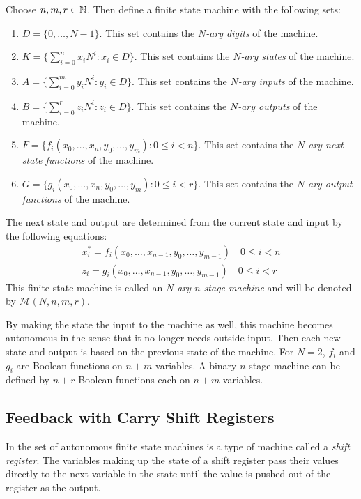 \begin{definition}\label{N-ary-n-stage-machine}
  Choose $n,m,r\in\mathbb{N}$. Then define a finite state machine with the
  following sets:
  \begin{enumerate}[1.]
    \item $D=\{0,\dots,N-1\}$. This set contains the {\em $N$-ary digits} of the
      machine.
    \item $K=\{\sum_{i=0}^{n}x_iN^i:x_i\in D\}$. This set contains the
      {\em $N$-ary states} of the machine.
    \item $A=\{\sum_{i=0}^{m}y_iN^i:y_i\in D\}$. This set contains the
      {\em $N$-ary inputs} of the machine.
    \item $B=\{\sum_{i=0}^{r}z_iN^i:z_i\in D\}$. This set contains the
      {\em $N$-ary outputs} of the machine.
    \item $F=\{f_i(x_0,\dots,x_n,y_0,\dots,y_m):0\le i<n\}$. This set contains
      the {\em $N$-ary next state functions} of the machine.
    \item $G=\{g_i(x_0,\dots,x_n,y_0,\dots,y_m):0\le i<r\}$. This set contains
      the {\em $N$-ary output functions} of the machine.
  \end{enumerate}
  The next state and output are determined from the current state and input by the
  following equations:
  \begin{eqnarray}
    x_i^*=f_i(x_0,\dots,x_{n-1},y_0,\dots,y_{m-1}) \quad 0\le i<n \\
    z_i=g_i(x_0,\dots,x_{n-1},y_0,\dots,y_{m-1}) \quad 0\le i<r
  \end{eqnarray}
  This finite state machine is called an {\em $N$-ary $n$-stage machine} and
  will be denoted by $\mathcal{M}(N,n,m,r)$.
\end{definition}

\par By making the state the input to the machine as well, this machine
becomes autonomous in the sense that it no longer needs outside input. Then
each new state and output is based on the previous state of the machine. For
$N=2$, $f_i$ and $g_i$ are Boolean functions on $n+m$ variables.
A binary $n$-stage machine can be defined by $n+r$ Boolean functions each
on $n+m$ variables.

\subsection{Feedback with Carry Shift Registers}

\par In the set of autonomous finite state machines is a type of machine
called a {\it shift register}. The variables making up the state of a shift
register pass their values directly to the next variable in the state until
the value is pushed out of the register as the output.

